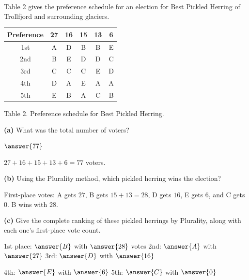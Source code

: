 \documentclass[12pt]{ximera}
\begin{document}
\begin{problem}
Table 2 gives the preference schedule for an election for Best Pickled Herring of
Trollfjord and surrounding glaciers.

\begin{center}
\begin{tabular}{c|ccccc}
Preference & 27 & 16 & 15 & 13 & 6 \\\hline
1st & A & D & B & B & E \\
2nd & B & E & D & D & C \\
3rd & C & C & C & E & D \\
4th & D & A & E & A & A \\
5th & E & B & A & C & B
\end{tabular}

\smallskip
Table 2. Preference schedule for Best Pickled Herring.
\end{center}

\begin{prompt}
\textbf{(a)} What was the total number of voters?

$\answer{77}$

\begin{feedback}
$27+16+15+13+6 = 77$ voters.
\end{feedback}
\end{prompt}

\begin{prompt}
\textbf{(b)} Using the Plurality method, which pickled herring wins the election?

\begin{multipleChoice}
\end{multipleChoice}

\begin{feedback}
First-place votes: A gets $27$, B gets $15+13=28$, D gets $16$, E gets $6$, and C gets
$0$. B wins with $28$.
\end{feedback}
\end{prompt}

\begin{prompt}
\textbf{(c)} Give the complete ranking of these pickled herrings by Plurality, along
with each one's first-place vote count.

1st place: $\answer{B}$ with $\answer{28}$ votes \qquad
2nd: $\answer{A}$ with $\answer{27}$ \qquad
3rd: $\answer{D}$ with $\answer{16}$

\smallskip
4th: $\answer{E}$ with $\answer{6}$ \qquad
5th: $\answer{C}$ with $\answer{0}$


\end{prompt}
\end{problem}
\end{document}
